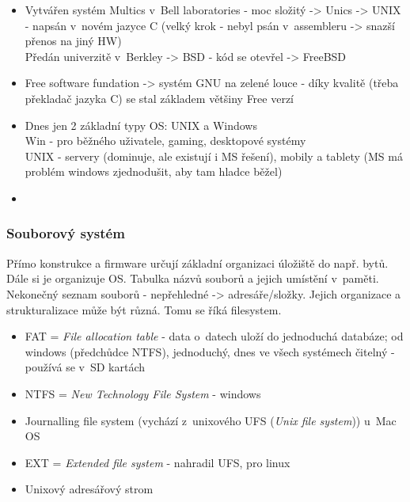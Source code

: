 \documentclass[12pt]{article}
\begin{document}
\begin{itemize}
\item Vytvářen systém Multics  v~Bell laboratories - moc složitý -> Unics -> UNIX - napsán v~novém jazyce C (velký krok - nebyl psán v~assembleru -> snazší přenos na jiný HW)\\
Předán univerzitě v~Berkley -> BSD - kód se otevřel -> FreeBSD
\item Free software fundation -> systém GNU na zelené louce - díky kvalitě (třeba překladač jazyka C) se stal základem většiny Free verzí
\item Dnes jen 2 základní typy OS: UNIX a Windows\\
Win - pro běžného uživatele, gaming, desktopové systémy\\
UNIX - servery (dominuje, ale existují i MS řešení), mobily a tablety (MS má problém windows zjednodušit, aby tam hladce běžel)
\item
\end{itemize}

\subsubsection{Souborový systém}
Přímo konstrukce a firmware určují základní organizaci úložiště do např. bytů. Dále si je organizuje OS. Tabulka názvů souborů a jejich umístění v~paměti. Nekonečný seznam souborů - nepřehledné -> adresáře/složky. Jejich organizace a strukturalizace může být různá. Tomu se říká filesystem.
\begin{itemize}
\item FAT  = \emph{File allocation table} - data o~datech uloží do jednoduchá databáze; od windows (předchůdce NTFS), jednoduchý, dnes ve všech systémech čitelný - používá se v~SD kartách
\item NTFS = \emph{New Technology File System} - windows
\item Journalling file system (vychází z~unixového UFS (\emph{Unix file system})) u~Mac OS
\item EXT = \emph{Extended file system} - nahradil  UFS, pro linux
\item Unixový adresářový strom
\end{itemize}
\end{document}
